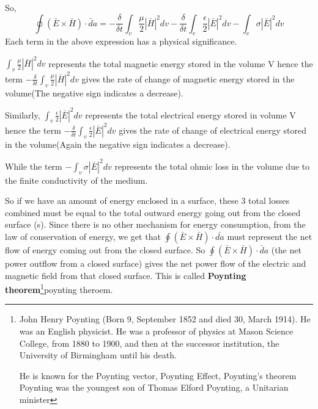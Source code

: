 So,
\begin{dmath}
\oint(\bar{E}\times\bar{H})\cdot\bar{d}a = -  \frac{\delta}{\delta t}\int_{v} \frac{\mu}{2}|\bar{H}|^{2}dv -  \frac{\delta}{\delta t}\int_{v}\frac{\epsilon}{2}|\bar{E}|^{2}dv
- \int_{v}\sigma|\bar{E}|^{2}dv 
\end{dmath}
Each term in the above expression has a physical significance.

$\int_{v} \frac{\mu}{2}|\bar{H}|^{2}dv$ represents the total magnetic energy stored in the volume V hence the term $-\frac{\delta}{\delta t}\int_{v} \frac{\mu}{2}|\bar{H}|^{2}dv$ gives the rate of change of magnetic energy stored in the volume(The negative sign indicates a decrease).

Similarly, $\int_{v}\frac{\epsilon}{2}|\bar{E}|^{2}dv$ represents the total electrical energy stored in volume V hence the term $-\frac{\delta}{\delta t}\int_{v}\frac{\epsilon}{2}|\bar{E}|^{2}dv$ gives the rate of change of electrical energy stored in the volume(Again the negative sign indicates a decrease).

While the term $-\int_{v}\sigma|\bar{E}|^{2}dv $ represents the total ohmic loss in the volume due to the finite conductivity of the medium.

So if we have an amount of energy enclosed in a surface, these 3 total losses combined must be equal to the total outward energy going out from the closed surface (s). Since there is no other mechanism for energy consumption, from the law of conservation of energy, we get that $ \oint(\bar{E}\times\bar{H})\cdot\bar{da} $ must represent the net flow of energy coming out from the closed surface. So $ \oint(\bar{E}\times\bar{H})\cdot\bar{d}a $ (the net power outflow from a closed surface)  gives the net power flow of the electric and magnetic field from that closed surface. This is called \textbf{Poynting theorem}\footnote{
John Henry Poynting (Born 9, September 1852 and died 30, March 1914). He was an English physicist. He was a professor of physics at Mason Science College, from 1880 to 1900, and then at the successor institution, the University of Birmingham until his death.

He is known for the Poynting vector, Poynting Effect, Poynting's theorem 
Poynting was the youngest son of Thomas Elford Poynting, a Unitarian minister
}poynting theroem. 
